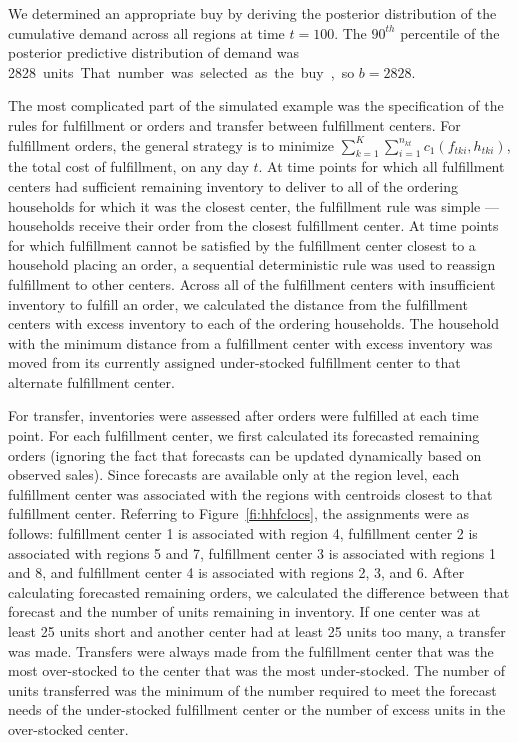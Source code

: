 \documentclass[11pt, oneside]{article}   	%
\begin{document}
We determined an appropriate buy by deriving the posterior distribution of the cumulative demand across all regions at time $t = 100$.  The $90^{th}$ percentile of the posterior predictive distribution of demand was \SI{2828} units.  That number was selected as the buy, so $b = 2828$.

The most complicated part of the simulated example was the specification of the rules for fulfillment or orders and transfer between fulfillment centers.  For fulfillment orders, the general strategy is to minimize $\sum_{k = 1}^K \sum_{i = 1}^{n_{kt}} c_1 (f_{tki}, h_{tki})$, the total cost of fulfillment, on any day $t$.  At time points for which all fulfillment centers had sufficient remaining inventory to deliver to all of the ordering households for which it was the closest center, the fulfillment rule was simple --- households receive their order from the closest fulfillment center.  At time points for which fulfillment cannot be satisfied by the fulfillment center closest to a household placing an order, a sequential deterministic rule was used to reassign fulfillment to other centers.  Across all of the fulfillment centers with insufficient inventory to fulfill an order, we calculated the distance from the fulfillment centers with excess inventory to each of the ordering households.  The household with the minimum distance from a fulfillment center with excess inventory was moved from its currently assigned under-stocked fulfillment center to that alternate fulfillment center.

For transfer, inventories were assessed after orders were fulfilled at each time point.  For each fulfillment center, we first calculated its forecasted remaining orders (ignoring the fact that forecasts can be updated dynamically based on observed sales).  Since forecasts are available only at the region level, each fulfillment center was associated with the regions with centroids closest to that fulfillment center.  Referring to Figure~\ref{fi:hhfclocs}, the assignments were as follows: fulfillment center 1 is associated with region 4, fulfillment center 2 is associated with regions 5 and 7, fulfillment center 3 is associated with regions 1 and 8, and fulfillment center 4 is associated with regions 2, 3, and 6.  After calculating forecasted remaining orders, we calculated the difference between that forecast and the number of units remaining in inventory.  If one center was at least 25 units short and another center had at least 25 units too many, a transfer was made.  Transfers were always made from the fulfillment center that was the most over-stocked to the center that was the most under-stocked.  The number of units transferred was the minimum of the number required to meet the forecast needs of the under-stocked fulfillment center or the number of excess units in the over-stocked center.
\end{document}
